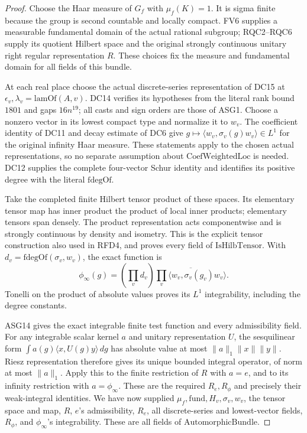 \documentclass[11pt,a4paper]{article}
\numberwithin{equation}{section}
\theoremstyle{remark}\newtheorem{remark}[theorem]{Remark}
\begin{document}
\begin{proof}
Choose the Haar measure of \(G_f\) with \(\mu_f(K)=1\).
It is sigma finite because the group is second countable and locally
compact.  FV6 supplies a measurable fundamental domain of the actual
rational subgroup; RQC2--RQC6 supply its quotient Hilbert space and
the original strongly continuous unitary right regular representation
\(R\).  These choices fix the measure and fundamental domain for
all fields of this bundle.

At each real place choose the actual discrete-series representation of
DC15 at \(\epsilon_v,\lambda_v=\mathrm{lamOf}(A,v)\).
DC14 verifies its hypotheses from the literal rank bound \(1801\)
and gaps \(16n^{19}\); all casts and sign orders are those of
ASG1.  Choose a nonzero vector in its lowest compact type and normalize
it to \(w_v\).  The coefficient identity of DC11 and decay estimate
of DC6 give
\(g\mapsto\langle w_v,\sigma_v(g)w_v\rangle\in L^1\)
for the original infinity Haar measure.  These statements apply to the
chosen actual representations, so no separate assumption about
\(\mathrm{CoefWeightedLoc}\) is needed.  DC12 supplies the complete
four-vector Schur identity and identifies its positive degree with the
literal \(\mathrm{fdegOf}\).

Take the completed finite Hilbert tensor product of these spaces.
Its elementary tensor map has inner product the product of local inner
products; elementary tensors span densely.  The product representation
acts componentwise and is strongly continuous by density and isometry.
This is the explicit tensor construction also used in RFD4, and proves
every field of \(\mathrm{IsHilbTensor}\).
With \(d_v=\mathrm{fdegOf}(\sigma_v,w_v)\), the exact function is
\[
 \phi_\infty(g)=\left(\prod_v d_v\right)
            \overline{\prod_v\langle w_v,\sigma_v(g_v)w_v\rangle}.
\tag{ASG.13}
\]
Tonelli on the product of absolute values proves its \(L^1\)
integrability, including the degree constants.

ASG14 gives the exact integrable finite test function and every
admissibility field.  For any integrable scalar kernel \(a\) and
unitary representation \(U\), the sesquilinear form
\(\int a(g)\langle x,U(g)y\rangle\,dg\) has absolute value
at most \(\|a\|_1\|x\|\|y\|\).  Riesz representation
therefore gives its unique bounded integral operator, of norm at most
\(\|a\|_1\).  Apply this to the finite restriction of \(R\)
with \(a=e\), and to its infinity restriction with
\(a=\phi_\infty\).  These are the required \(R_e,R_\phi\)
and precisely their weak-integral identities.
We have now supplied \(\mu_f,\mathrm{fund},H_v,\sigma_v,w_v\),
the tensor space and map, \(R\), \(e\)'s admissibility,
\(R_e\), all discrete-series and lowest-vector fields,
\(R_\phi\), and \(\phi_\infty\)'s integrability.
These are all fields of \(\mathrm{AutomorphicBundle}\).
\end{proof}
\end{document}
